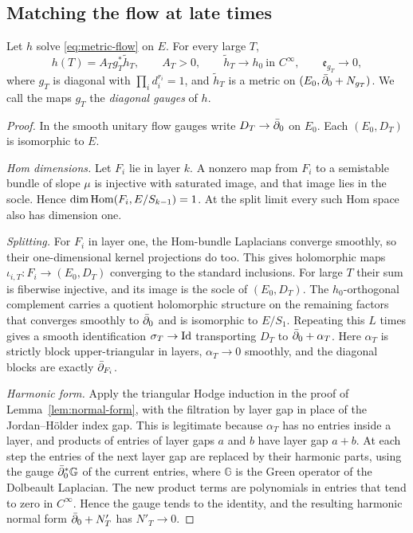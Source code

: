 \subsection{Matching the flow at late times}

\begin{lemma}\label{lem:socle-matching}
Let $h$ solve \eqref{eq:metric-flow} on $E$. For every large $T$,
\[
 h(T)=A_Tg_T^*\widetilde h_T,\qquad A_T>0,\qquad
 \widetilde h_T\longrightarrow h_0\ \text{in }C^\infty,\qquad
 \mathfrak e_{g_T}\longrightarrow0,
\]
where $g_T$ is diagonal with $\prod_id_i^{r_i}=1$, and $\widetilde h_T$ is
a metric on $(E_0,\bar\partial_0+N_{g_T})$. We call the maps $g_T$ the
\emph{diagonal gauges} of $h$.
\end{lemma}

\begin{proof}
In the smooth unitary flow gauges write $D_T\to\bar\partial_0$ on $E_0$. Each
$(E_0,D_T)$ is isomorphic to $E$.

\emph{Hom dimensions.} Let $F_i$ lie in layer $k$. A nonzero map from $F_i$
to a semistable bundle of slope $\mu$ is injective with saturated image,
and that image lies in the socle. Hence $\dim\operatorname{Hom}(F_i,E/S_{k-1})=1$. At
the split limit every such Hom space also has dimension one.

\emph{Splitting.} For $F_i$ in layer one, the Hom-bundle Laplacians
converge smoothly, so their one-dimensional kernel projections do too. This
gives holomorphic maps $\iota_{i,T}:F_i\to(E_0,D_T)$ converging to the
standard inclusions. For large $T$ their sum is fiberwise injective, and
its image is the socle of $(E_0,D_T)$. The $h_0$-orthogonal complement
carries a quotient holomorphic structure on the remaining factors that
converges smoothly to $\bar\partial_0$ and is isomorphic to $E/S_1$. Repeating this
$L$ times gives a smooth identification $\sigma_T\to\operatorname{Id}$ transporting $D_T$
to $\bar\partial_0+\alpha_T$. Here $\alpha_T$ is strictly block upper-triangular in
layers, $\alpha_T\to0$ smoothly, and the diagonal blocks are exactly
$\bar\partial_{F_i}$.

\emph{Harmonic form.} Apply the triangular Hodge induction in the proof of
Lemma~\ref{lem:normal-form}, with the filtration by layer gap in place of
the Jordan--H\"older index gap. This is legitimate because $\alpha_T$ has no
entries inside a layer, and products of entries of layer gaps $a$ and $b$
have layer gap $a+b$. At each step the entries of the next layer gap are
replaced by their harmonic parts, using the gauge $\bar\partial_0^*\mathbb G$ of the
current entries, where $\mathbb G$ is the Green operator of the Dolbeault
Laplacian. The new product terms are polynomials in entries that tend to
zero in $C^\infty$. Hence the gauge tends to the identity, and the resulting
harmonic normal form $\bar\partial_0+N'_T$ has $N'_T\to0$.


\end{proof}
